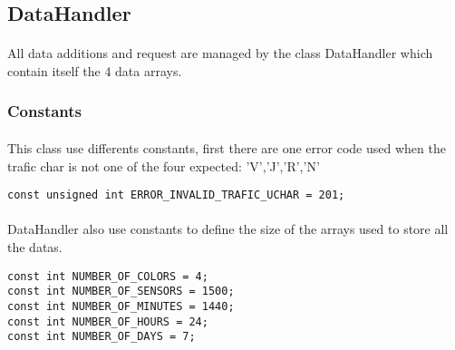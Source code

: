 \documentclass[a4paper, 12pts]{article}
\begin{document}
\subsection{DataHandler}
\paragraph{}
All data additions and request are managed by the class DataHandler which contain itself the 4 data arrays.

\subsubsection{Constants}

\paragraph{}
	This class use differents constants, first there are one error code used when the trafic char is not one of the four expected: 'V','J','R','N'

\begin{lstlisting}
const unsigned int ERROR_INVALID_TRAFIC_UCHAR = 201;
\end{lstlisting}

\paragraph{}
	DataHandler also use constants to define the size of the arrays used to store all the datas.

\begin{lstlisting}
const int NUMBER_OF_COLORS = 4;
const int NUMBER_OF_SENSORS = 1500;
const int NUMBER_OF_MINUTES = 1440;
const int NUMBER_OF_HOURS = 24;
const int NUMBER_OF_DAYS = 7;
\end{lstlisting}

\end{document}
